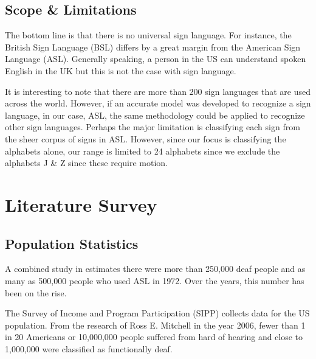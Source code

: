 \documentclass[twocolumn]{article}
\begin{document}
\subsection{Scope \& Limitations}
The bottom line is that there is no universal sign language. For instance, the 
British Sign Language (BSL) differs by a great margin from the American Sign 
Language (ASL). Generally speaking, a person in the US can understand spoken 
English in the UK but this is not the case with sign language.

It is interesting to note that there are more than 200 sign languages that are 
used across the world. However, if an accurate model was developed to 
recognize a sign language, in our case, ASL, the same methodology could be 
applied to recognize other sign languages. Perhaps the major limitation is 
classifying each sign from the sheer corpus of signs in ASL.
However, since our focus is 
classifying the alphabets alone, our range is limited to 24 alphabets since we 
exclude the alphabets J \& Z since these require motion.

\section{Literature Survey}

\subsection{Population Statistics}
A combined study in \cite{mitchell2006many} estimates there were more than 250,000 deaf people and 
as many as 500,000 people who used ASL in 1972. Over the years, this number 
has been on the rise.

The Survey of Income and Program Participation (SIPP) collects data for the US 
population. From the research of Ross E. Mitchell \cite{mitchell2006many} in the year 2006, fewer 
than 1 in 20 Americans or 10,000,000 people suffered from hard of hearing and 
close to 1,000,000 were classified as functionally deaf.




\glsaddall
\printglossary[type=\acronymtype,title=List Of Abbreviations]
\end{document}
